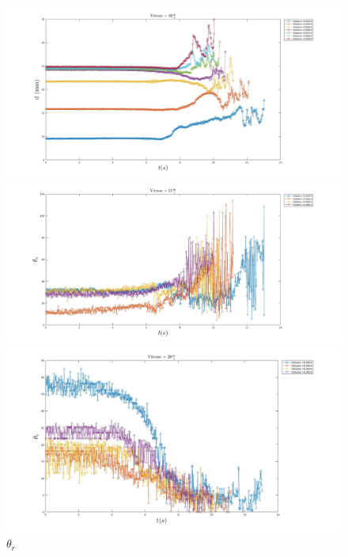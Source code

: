\begin{figure}[!h]
	\begin{minipage}{0.95\linewidth}
	\includegraphics[width = \linewidth]{./image/v=20d.jpg}
	\caption{$d$}
	\end{minipage}
	\begin{minipage}{0.95\linewidth}
	\includegraphics[width = \linewidth]{./image/v=20oa_2.jpg}
	\caption{$\theta_{a}$}
	\end{minipage}
	\begin{minipage}{0.95\linewidth}
	\includegraphics[width = \linewidth]{./image/v=20or_2.jpg}
	\caption{$\theta_{r}$}
	\end{minipage}
\end{figure}


